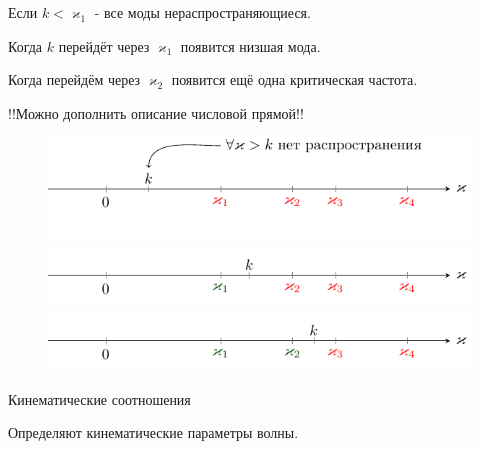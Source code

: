 \documentclass[a4paper,14pt]{extarticle}
\renewcommand{\kappa}{\varkappa}
\begin{document}
Если $k < \kappa_1$ - все моды нераспространяющиеся.

Когда $k$ перейдёт через $\kappa_1$ появится низшая мода.

Когда перейдём через $\kappa_2$  появится ещё одна критическая частота.

!!Можно дополнить описание числовой прямой!!
\begin{figure}[h!]
	\centering
	\includegraphics[scale=1]{img/lect3_ris5}
	\includegraphics[scale=1]{img/lect3_ris6}
	\includegraphics[scale=1]{img/lect3_ris7}
\end{figure}

Кинематические соотношения

Определяют кинематические параметры волны.
\end{document}
